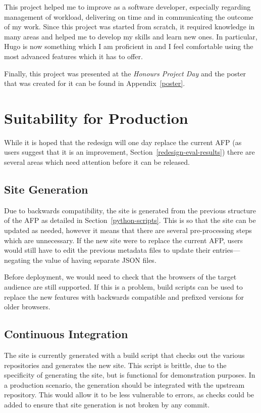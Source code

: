 \documentclass[bsc,frontabs,oneside,singlespacing,parskip,deptreport,logo]{infthesis}
\begin{document}
This project helped me to improve as a software developer, especially regarding management of workload, delivering on time and in communicating the outcome of my work. Since this project was started from scratch, it required knowledge in many areas and helped me to develop my skills and learn new ones. In particular, Hugo is now something which I am proficient in and I feel comfortable using the most advanced features which it has to offer.

Finally, this project was presented at the \emph{Honours Project Day} and the poster that was created for it can be found in Appendix~\ref{poster}.

\section{Suitability for Production}

While it is hoped that the redesign will one day replace the current AFP (as users suggest that it is an improvement, Section~\ref{redesign-eval-results}) there are several areas which need attention before it can be released.

\subsection{Site Generation}

Due to backwards compatibility, the site is generated from the previous structure of the AFP as detailed in Section~\ref{python-scripts}. This is so that the site can be updated as needed, however it means that there are several pre-processing steps which are unnecessary. If the new site were to replace the current AFP, users would still have to edit the previous metadata files to update their entries---negating the value of having separate JSON files.

Before deployment, we would need to check that the browsers of the target audience are still supported. If this is a problem, build scripts can be used to replace the new features with backwards compatible and prefixed versions for older browsers.

\subsection{Continuous Integration}

The site is currently generated with a build script that checks out the various repositories and generates the new site. This script is brittle, due to the specificity of generating the site, but is functional for demonstration purposes. In a production scenario, the generation should be integrated with the upstream repository. This would allow it to be less vulnerable to errors, as checks could be added to ensure that site generation is not broken by any commit. 
\end{document}
